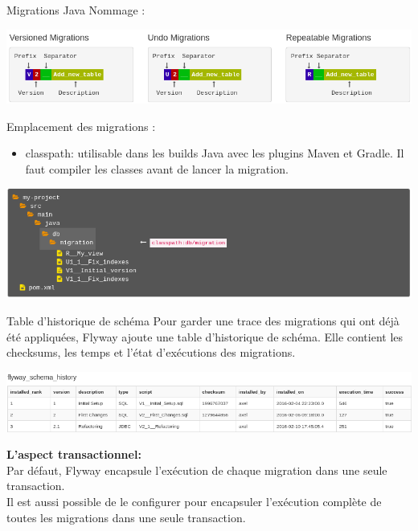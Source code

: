 \documentclass[slidestop,compress,11pt,xcolor=dvipsnames,french]{beamer}
\begin{document}
\begin{frame}{Migrations Java}
Nommage :
\begin{center}
 \includegraphics[scale=0.3]{nommage_java.png}
\end{center}

Emplacement des migrations :
\begin{itemize}
 \item classpath: utilisable dans les builds Java avec les plugins Maven et Gradle. Il faut compiler les classes avant de lancer la migration.
\end{itemize}

\begin{center}
 \includegraphics[scale=0.2,keepaspectratio=true]{locations_java.png}
\end{center}

\end{frame}

\begin{frame}{Table d'historique de schéma}
Pour garder une trace des migrations qui ont déjà été appliquées, Flyway ajoute une table d'historique de schéma. Elle contient les checksums, les temps et l'état d'exécutions des migrations.
\begin{center}
 \includegraphics[scale=0.3,keepaspectratio=true]{schema_history_table.png}
\end{center}

\textbf{L'aspect transactionnel:} \\
Par défaut, Flyway encapsule l'exécution de chaque migration dans une seule transaction.\\
Il est aussi possible de le configurer pour encapsuler l'exécution complète de toutes les migrations dans une seule transaction.                                                                            

\end{frame}
\end{document}
